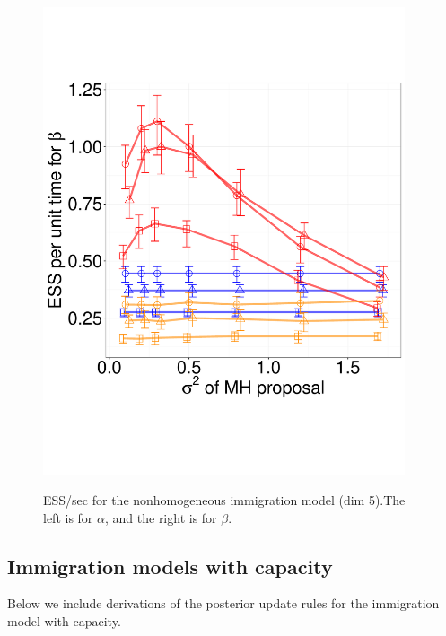 \begin{figure}[H]
\begin{minipage}[!hp]{0.45\linewidth}
    \includegraphics [width=0.950\textwidth, angle=0]{figs/pc_5_beta.pdf}
    \vspace{-0 in}
     \label{fig:ESS_pc_5}
  \end{minipage}
    \caption{ESS/sec for the nonhomogeneous immigration model (dim 5).The left is 
    for $\alpha$, and the right is for $\beta$.}
  \end{figure}

  \subsection{Immigration models with capacity}
  Below we include derivations of the posterior update rules for the immigration
  model with capacity.

